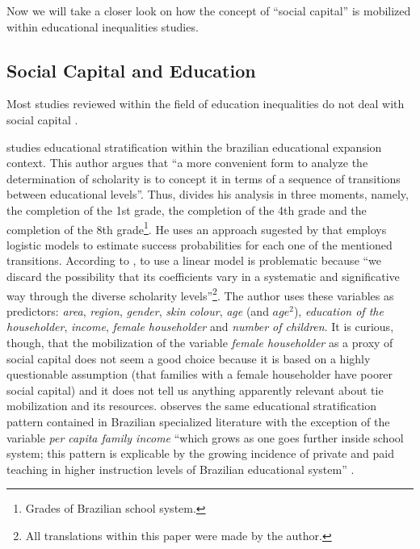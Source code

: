 \documentclass[a4paper, 12pt, openright, oneside, article, german, french, brazil, english]{abntex2}
\begin{document}
Now we will take a closer look on how the concept of ``social capital'' is mobilized within educational inequalities studies.


\subsection{Social Capital and Education}

Most studies reviewed within the field of education inequalities do not deal with social capital \cite{ribeiro2009desigualdade,ribeiro2009classe,prates2014desigualdades,vilela2009origens,fernandes2005estratificaccao}. 

 studies educational stratification within the brazilian educational expansion context. This author argues that ``a more convenient form to analyze the determination of scholarity is to concept it in terms of a sequence of transitions between educational levels''. Thus,  divides his analysis in three moments, namely, the completion of the 1st grade, the completion of the 4th grade and the completion of the 8th grade\footnote{Grades of Brazilian school system.}. He uses an approach sugested by  that employs logistic models to estimate success probabilities for each one of the mentioned transitions. According to , to use a linear model is problematic because ``we discard the possibility that its coefficients vary in a systematic and significative way through the diverse scholarity levels''\footnote{All translations within this paper were made by the author.}. The author uses these variables as predictors: \textit{area}, \textit{region}, \textit{gender}, \textit{skin colour}, \textit{age} (and $age^2$), \textit{education of the householder}, \textit{income}, \textit{female householder} and \textit{number of children}. It is curious, though, that the mobilization of the variable \textit{female householder} as a proxy of social capital does not seem a good choice because it is based on a highly questionable assumption (that families with a female householder have poorer social capital) and it does not tell us anything apparently relevant about tie mobilization and its resources.  observes the same educational stratification pattern contained in Brazilian specialized literature with the exception of the variable \textit{per capita family income} ``which grows as one goes further inside school system; this pattern is explicable by the growing incidence of private and paid teaching in higher instruction levels of Brazilian educational system'' \cite[p. 132]{silva2003expansao}.
\end{document}
